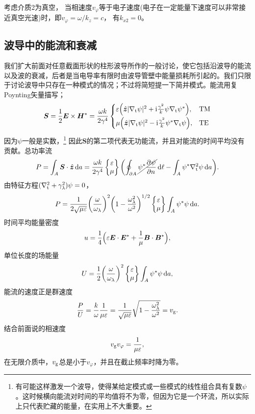 考虑介质2为真空，
当相速度$v_\varphi$等于电子速度(电子在一定能量下速度可以非常接近真空光速)时，即$v_\varphi=\omega/k_z=c$，
有$k_{x2}=0$。

\subsection{波导中的能流和衰减}

我们扩大前面对任意截面形状的柱形波导所作的一般讨论，使它包括沿波导的能流以及波的衰减，后者是当电导率有限时由波导管壁中能量损耗所引起的。我们只限于讨论波导中只存在一种模式的情况；不过将简短提一下简并模式。能流用复Poynting矢量描写；
\begin{equation}
    \bm S=\frac12\bm E\times\bm H^\ast=\frac{\omega k}{2\gamma^4}
    \begin{cases}
        \varepsilon\Bigl(\mathop{}\!\hat{\bm{z}}|\nabla_\text t\psi|^2+\mathrm{i}\frac{\gamma^2}k\psi\nabla_\text t\psi^\ast\Bigr),&\text{TM}\\[1ex]
        \mu\Bigl(\mathop{}\!\hat{\bm{z}}|\nabla_\text t\psi|^2-\mathrm{i}\frac{\gamma^2}k\psi^\ast\nabla_\text t\psi\Bigr),&\text{TE}
    \end{cases}
\end{equation}
因为$\psi$一般是实数，\footnote{有可能这样激发一个波导，使得某给定模式或一些模式的线性组合具有复数$\psi$。这时候横向能流对时间的平均值将不为零，但因为它是一个环流，所以实际上只代表贮藏的能量，在实用上不大重要。}
因此$\bm S$的第二项代表无功能流，并且对能流的时间平均没有贡献。总功率流
\[
    P=\int_A\bm S\cdot\mathop{}\!\hat{\bm{z}}\mathop{}\!\mathrm{d} a=\frac{\omega k}{2\gamma^4}
    \begin{Bmatrix}
        \varepsilon\\\mu
    \end{Bmatrix}
    \biggl(\oint_{\partial A}\cancel{\psi^\ast\frac{\partial^{{}}\psi}{\partial{n}^{{}}}}\mathop{}\!\mathrm{d}\ell-\int_A\psi^\ast\nabla_\text t^2\psi\mathop{}\!\mathrm{d} a\biggr).
\]
由特征方程$(\nabla_\text t^2+\gamma_\lambda^2)\psi=0$，
\[
    P=\frac1{2\sqrt{\mu\varepsilon}}\biggl(\frac\omega{\omega_\lambda}\biggr)^2\biggl(1-\frac{\omega_\lambda^2}{\omega^2}\biggr)^{1/2}
    \begin{Bmatrix}
        \varepsilon\\\mu
    \end{Bmatrix}
    \int_A\psi^\ast\psi\mathop{}\!\mathrm{d} a.
\]
时间平均能量密度
\[
    u=\frac14\Bigl(\varepsilon\bm E\cdot\bm E^\ast+\frac1\mu\bm B\cdot\bm B^\ast\Bigr),
\]
单位长度的场能量
\[
    U=\frac12\biggl(\frac\omega{\omega_\lambda}\biggr)^2
    \begin{Bmatrix}
        \varepsilon\\\mu
    \end{Bmatrix}
    \int_A\psi^\ast\psi\mathop{}\!\mathrm{d} a,
\]
能流的速度正是群速度
\[
    \frac PU=\frac k\omega\frac1{\mu\varepsilon}=\frac1{\sqrt{\mu\varepsilon}}\sqrt{1-\frac{\omega_\lambda^2}{\omega^2}}=v_\text g.
\]
结合前面说的相速度
\begin{equation}
    v_\text gv_\varphi=\frac1{\mu\varepsilon},
\end{equation}
在无限介质中，$v_\text g$总是小于$v_\varphi$，并且在截止频率时降为零。

